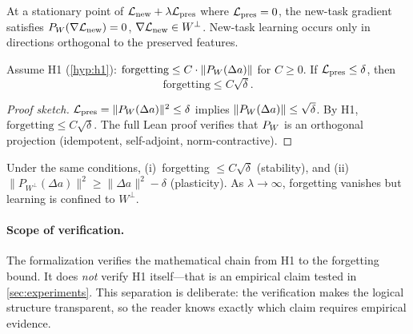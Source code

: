 \begin{proposition}
\label{prop:grad_orth}
At a stationary point of $\mathcal{L}_{\text{new}} + \lambda \mathcal{L}_{\text{pres}}$ where $\mathcal{L}_{\text{pres}} = 0$, the new-task gradient satisfies $P_W(\nabla \mathcal{L}_{\text{new}}) = 0$, \ie $\nabla \mathcal{L}_{\text{new}} \in W^\perp$.
New-task learning occurs only in directions orthogonal to the preserved features.
\end{proposition}

\begin{theorem}
\label{thm:main}
Assume H1 (\cref{hyp:h1}): $\text{forgetting} \leq C \cdot \| P_W(\Delta a) \|$ for $C \geq 0$.
If $\mathcal{L}_{\text{pres}} \leq \delta$, then
\begin{equation}
    \text{forgetting} \leq C \sqrt{\delta}.
    \label{eq:reduction}
\end{equation}
\end{theorem}

\begin{proof}[Proof sketch]
$\mathcal{L}_{\text{pres}} = \| P_W(\Delta a) \|^2 \leq \delta$ implies $\| P_W(\Delta a) \| \leq \sqrt{\delta}$.
By H1, $\text{forgetting} \leq C\sqrt{\delta}$.
The full Lean proof verifies that $P_W$ is an orthogonal projection (idempotent, self-adjoint, norm-contractive).
\end{proof}

\begin{theorem}
\label{thm:tradeoff}
Under the same conditions, (i)~forgetting $\leq C\sqrt{\delta}$ (stability), and (ii)~$\| P_{W^\perp}(\Delta a) \|^2 \geq \| \Delta a \|^2 - \delta$ (plasticity).
As $\lambda \to \infty$, forgetting vanishes but learning is confined to $W^\perp$.
\end{theorem}

\paragraph{Scope of verification.}
The formalization verifies the mathematical chain from H1 to the forgetting bound.
It does \emph{not} verify H1 itself---that is an empirical claim tested in \cref{sec:experiments}.
This separation is deliberate: the verification makes the logical structure transparent, so the reader knows exactly which claim requires empirical evidence.
